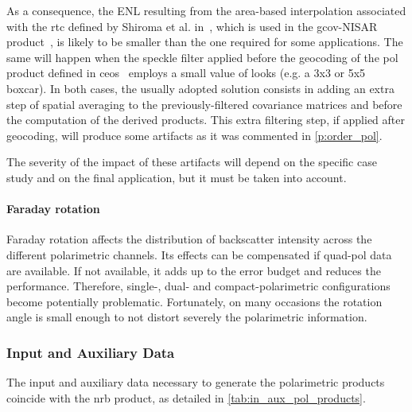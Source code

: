 As a consequence, the ENL resulting from the area-based interpolation associated with the \acs{rtc} defined by Shiroma et al. in~\cite{Shiroma2022}, which is used in the \acs{gcov}-NISAR product~\cite{NISAR_GCOV_ProdSpec}, is likely to be smaller than the one required for some applications. The same will happen when the speckle filter applied before the geocoding of the \acs{pol} product defined in \acs{ceos}~\cite{CEOS-ARD_PFS_SAR} employs a small value of looks (e.g. a 3x3 or 5x5 boxcar). In both cases, the usually adopted solution consists in adding an extra step of spatial averaging to the previously-filtered covariance matrices and before the computation of the derived products. This extra filtering step, if applied after geocoding, will produce some artifacts as it was commented in \autoref{p:order_pol}.

The severity of the impact of these artifacts will depend on the specific case study and on the final application, but it must be taken into account.

\paragraph*{Faraday rotation}

Faraday rotation affects the distribution of backscatter intensity across the different polarimetric channels. Its effects can be compensated if quad-pol data are available. If not available, it adds up to the error budget and reduces the performance. Therefore,  single-, dual- and compact-polarimetric configurations become potentially problematic. Fortunately, on many occasions the rotation angle is small enough to not distort severely the polarimetric information. 


\subsubsection{Input and Auxiliary Data}
\label{sec:aux_data_pol}

The input and auxiliary data necessary to generate the polarimetric products coincide with the \acs{nrb} product, as detailed in \autoref{tab:in_aux_pol_products}. 

